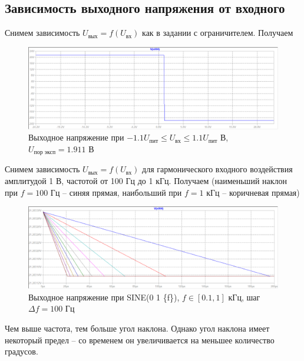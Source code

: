 \documentclass[a4paper, 12pt]{article}
\begin{document}
    \subsection{Зависимость выходного напряжения от входного}
    Снимем зависимость $U_\text{вых}=f\left( U_\text{вх} \right)$ как в задании с ограничителем.
    Получаем
    \begin{figure}[H]
        \centering
        \includegraphics[scale=0.46]{6task_fuin.png}
        \captionsetup{skip=0pt}
        \caption{Выходное напряжение при $-1.1U_\text{пит}\leq U_\text{вх}\leq 1.1U_\text{пит}$ В, $U_\text{пор эксп}=1.911$ В}
        \label{fig:6task_fuin}
    \end{figure}
    \noindent Снимем зависимость $U_\text{вых}=f\left( U_\text{вх} \right)$ для гармонического
    входного воздействия амплитудой 1 В, частотой от 100 Гц до 1 кГц. Получаем (наименьший наклон
    при $f=100$ Гц -- синяя прямая, наибольший при $f=1$ кГц -- коричневая прямая)
    \begin{figure}[H]
        \centering
        \includegraphics[scale=0.46]{6task_fuin_sine.png}
        \captionsetup{skip=0pt}
        \caption{Выходное напряжение при SINE(0 1 \{f\}), $f\in\left[ 0.1,1 \right]$ кГц, шаг $\Delta f=100$ Гц}
        \label{fig:6task_fuin_sine}
    \end{figure}
    \noindent Чем выше частота, тем больше угол наклона. Однако угол наклона имеет некоторый предел
    -- со временем он увеличивается на меньшее количество градусов.
\end{document}
